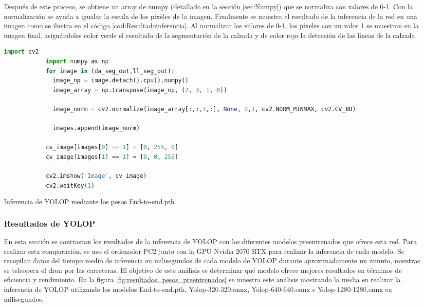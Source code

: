         Después de este proceso, se obtiene un array de numpy (detallado en la sección \ref{sec:Numpy}) que se normaliza con valores de 0-1. Con la normalización 
        se ayuda a igualar la escala de los píxeles de la imagen. Finalmente se muestra el resultado de la inferencia de la red 
        en una imagen como se ilustra en el código \ref{cod:Resultadoinferencia}. Al normalizar los valores de 0-1, los píxeles con un valor 1 se muestran en la imagen final, asignándoles 
        color verde el resultado de la segmentación de la calzada y de color rojo la detección de las líneas de la calzada. \newline
    
        \begin{code}[H]
          \begin{lstlisting}[language=Python]
            import cv2
            import numpy as np
            for image in (da_seg_out,ll_seg_out):
              image_np = image.detach().cpu().numpy()
              image_array = np.transpose(image_np, (2, 3, 1, 0))
    
              image_norm = cv2.normalize(image_array[:,:,1,:], None, 0,1, cv2.NORM_MINMAX, cv2.CV_8U)
    
              images.append(image_norm)
    
            cv_image[images[0] == 1] = [0, 255, 0]
            cv_image[images[1] == 1] = [0, 0, 255]
    
            cv2.imshow('Image', cv_image)
            cv2.waitKey(1)
          \end{lstlisting}
          \caption[Resultado de la inferencia del modelo YOLOP]{Inferencia de YOLOP mediante los pesos End-to-end.pth}
          \label{cod:Resultadoinferencia}
          \end{code}  


\subsubsection{Resultados de YOLOP }
\label{sec:resultados}
En esta sección se contrastan los resultados de la inferencia de YOLOP con los diferentes modelos preentrenados que ofrece esta red. Para realizar esta comparación, se uso el ordenador 
PC2 junto con la GPU Nvidia 2070 RTX para realizar la inferencia de cada modelo. Se recopilan datos del tiempo medio de inferencia en milisegundos de cada 
modelo de YOLOP durante aproximadamente
un minuto, mientras se teleopera el dron por las carreteras. El objetivo de este análisis es determinar qué modelo ofrece mejores resultados en términos de eficiencia y rendimiento. 
En la figura \ref{fig:resultados_pesos_preentrenados} se muestra este análisis mostrando la media en realizar la inferencia de YOLOP utilizando los modelos 
End-to-end.pth, Yolop-320-320.onnx, Yolop-640-640.onnx e Yolop-1280-1280.onnx en milisegundos.

